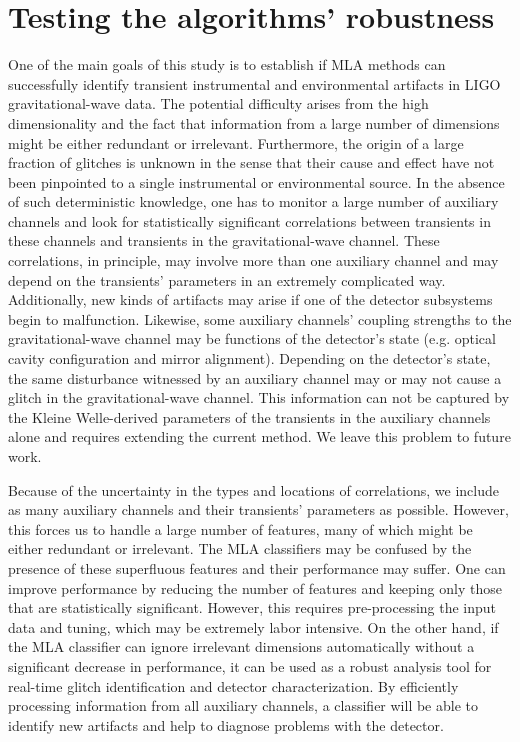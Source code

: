 \documentclass[prd, twocolumn, lengthcheck, superscriptaddress, showpacs, letterpaper, nofootinbib]{revtex4-1}
\begin{document}
\section{Testing the algorithms' robustness} %
\label{tuning}

One of the main goals of this study is to establish if \ac{MLA} methods can successfully identify transient instrumental and environmental artifacts in \ac{LIGO} gravitational-wave data. The potential difficulty arises from the high dimensionality and the fact that information from a large number of dimensions might be either redundant or irrelevant. Furthermore, the origin of a large fraction of glitches is unknown in the sense that their cause and effect have not been pinpointed to a single instrumental or environmental source. In the absence of such deterministic knowledge, one has to monitor a large number of auxiliary channels and look for statistically significant correlations between transients in these channels and transients in the gravitational-wave channel. These correlations, in principle, may involve more than one auxiliary channel and may depend on the transients' parameters in an extremely complicated way. Additionally, new kinds of artifacts may arise if one of the detector subsystems begin to malfunction. Likewise, some auxiliary channels' coupling strengths to the gravitational-wave channel may be functions of the detector's state (e.g. optical cavity configuration and mirror alignment). Depending on the detector's state, the same disturbance witnessed by an auxiliary channel may or may not cause a glitch in the gravitational-wave channel. This information can not be captured by the Kleine Welle-derived parameters of the transients in the auxiliary channels alone and requires extending the current method. We leave this problem to future work.  

Because of the uncertainty in the types and locations of correlations, we include as many auxiliary channels and their transients' parameters as possible. However, this forces us to handle a large number of features, many of which might be either redundant or irrelevant. The \ac{MLA} classifiers may be confused by the presence of these superfluous features and their performance may suffer. One can improve performance by reducing the number of features and keeping only those that are statistically significant. However, this requires pre-processing the input data and tuning, which may be extremely labor intensive. On the other hand, if the \ac{MLA} classifier can ignore irrelevant dimensions automatically without a significant decrease in performance, it can be used as a robust analysis tool for real-time glitch identification and detector characterization. By efficiently processing information from all auxiliary channels, a classifier will be able to identify new artifacts and help to diagnose problems with the detector.
\end{document}
